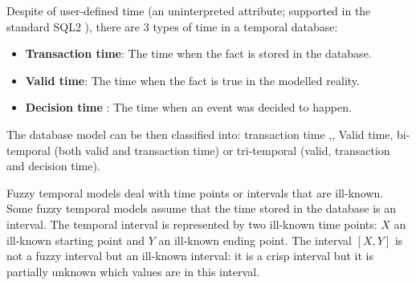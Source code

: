 

Despite of user-defined time (an uninterpreted attribute; supported in the standard SQL2 \cite{Mel93}), there are 3 types of time in a temporal database:

\begin{itemize}
	\item
	\textbf{Transaction time}: The time when the fact is stored in the database.
	\item
	\textbf{Valid time}: The time when the fact is true in the modelled reality.
	\item
	\textbf{Decision time} \cite{Nascimento95}: The time when an event was decided to happen. 
	\end{itemize}
	
	 The  database model can be then classified into: transaction time \cite{Ston87},\cite{Jensen91}, Valid time, bi-temporal \cite{Snodgrass84}(both valid and transaction time) or tri-temporal \cite{Nascimento95} (valid, transaction and decision time).

Fuzzy temporal models \cite{schockaert08} deal with time points \cite{Dubois89} or intervals \cite{Garrido2009} that are ill-known. Some fuzzy temporal models assume that the time stored in the database is an interval. The temporal interval is represented by two ill-known time points: $X$  an ill-known starting point and $Y$ an ill-known ending point. The interval $\left[X,Y\right]$ is not a fuzzy interval but an ill-known interval: it is a crisp interval but it is partially unknown which values are in this interval.
